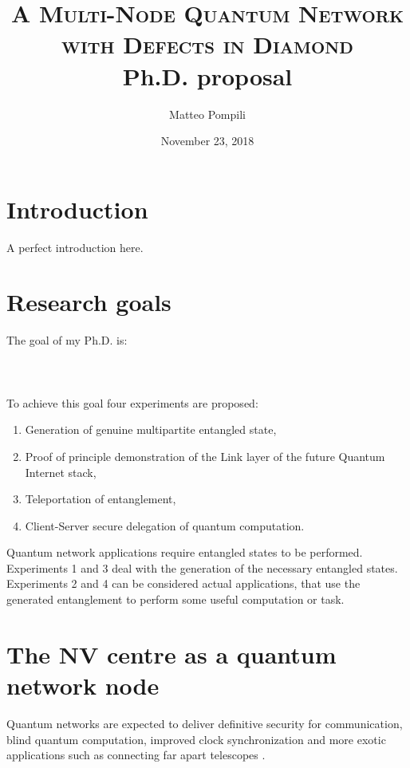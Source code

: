 \documentclass[a4paper, twoside]{article}
\title{
	\huge{\textsc{A Multi-Node Quantum Network\\with Defects in Diamond}}\\
	\vspace{10pt}\Large{Ph.D. proposal}
}
\author{Matteo Pompili}
\date{November 23, 2018}
\begin{document}
\maketitle

\section*{Introduction}
A perfect introduction here.
\blindtext[2]

\setcounter{secnumdepth}{1}
\setcounter{tocdepth}{1}
\tableofcontents

\newpage
\pagestyle{plain}
\section{Research goals}
The goal of my Ph.D. is:\\\\
\\\\

To achieve this goal four experiments are proposed: 
\begin{enumerate}
	\item Generation of genuine multipartite entangled state,
	\item Proof of principle demonstration of the Link layer of the future Quantum Internet stack,
	\item Teleportation of entanglement,
	\item Client-Server secure delegation of quantum computation.
\end{enumerate}

Quantum network applications require entangled states to be performed. Experiments 1 and 3 deal with the generation of the necessary entangled states. Experiments 2 and 4 can be considered actual applications, that use the generated entanglement to perform some useful computation or task.


\section{The NV centre as a quantum network node}

Quantum networks are expected to deliver definitive security for communication, blind quantum computation, improved clock synchronization and more exotic applications such as connecting far apart telescopes \cite{Wehner2018}.
\end{document}
